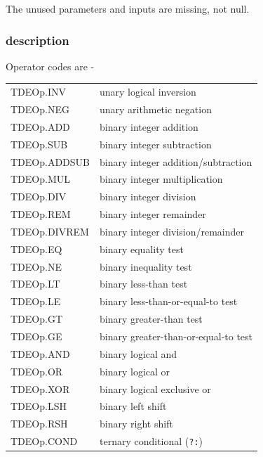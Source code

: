                 The unused parameters and inputs are missing, not null.

            \subsubsection{description}
                
                Operator codes are -

                \begin{tabular}{| l | l |}
                \hline
                TDEOp.INV    & unary logical inversion \\
                TDEOp.NEG    & unary arithmetic negation \\
                TDEOp.ADD    & binary integer addition \\
                TDEOp.SUB    & binary integer subtraction \\
                TDEOp.ADDSUB & binary integer addition/subtraction \\
                TDEOp.MUL    & binary integer multiplication \\
                TDEOp.DIV    & binary integer division \\
                TDEOp.REM    & binary integer remainder \\
                TDEOp.DIVREM & binary integer division/remainder \\
                TDEOp.EQ     & binary equality test \\
                TDEOp.NE     & binary inequality test \\
                TDEOp.LT     & binary less-than test \\
                TDEOp.LE     & binary less-than-or-equal-to test \\
                TDEOp.GT     & binary greater-than test \\
                TDEOp.GE     & binary greater-than-or-equal-to test \\
                TDEOp.AND    & binary logical and \\
                TDEOp.OR     & binary logical or \\
                TDEOp.XOR    & binary logical exclusive or \\
                TDEOp.LSH    & binary left shift \\
                TDEOp.RSH    & binary right shift \\
                TDEOp.COND   & ternary conditional (\verb'?:') \\
                \hline
                \end{tabular}
                
